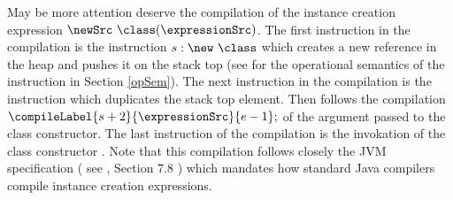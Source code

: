 May be more attention deserve the compilation of the instance creation expression
$\newSrc \ \class  (\expressionSrc )$. The first instruction in the compilation is the instruction $s : \new \ \class$ which 
creates a new reference in the heap and pushes it on the stack top 
(see for the operational semantics of the instruction in Section \ref{opSem}). The next instruction in the compilation is the instruction 
\dup which duplicates the stack top element. Then follows the compilation 
$ \compileLabel{s+2}{\expressionSrc}{e - 1 }; $ of the argument passed to the class constructor. The last instruction of the compilation
is the invokation of the class constructor  \Constructor{\class}. Note that this compilation follows closely 
the JVM specification ( see \cite{VMSpec}, Section 7.8 ) which mandates 
how standard Java compilers compile instance creation expressions.  
  


